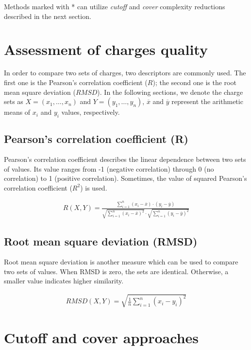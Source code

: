 \documentclass[oneside]{memoir}
\newcommand\ddfrac[2]{\frac{\displaystyle #1}{\displaystyle #2}}
\begin{document}
\bigskip

Methods marked with * can utilize \textit{cutoff} and \textit{cover} complexity reductions described in the next section.

\chapter*{Assessment of charges quality}

In order to compare two sets of charges, two descriptors are commonly used. The first one is the Pearson's correlation coefficient ($R$); the second one is the root mean square deviation ($RMSD$). In the following sections, we denote the charge sets as $X = (x_1, \ldots, x_n)$ and $Y = (y_1, \ldots, y_n)$, $\overline{x}$ and $\overline{y}$ represent the arithmetic means of $x_i$ and $y_i$ values, respectively.

\section*{Pearson's correlation coefficient (R)}

Pearson's correlation coefficient describes the linear dependence between two sets of values. Its value ranges from -1 (negative correlation) through 0 (no correlation) to 1 (positive correlation). Sometimes, the value of squared Pearson's correlation coefficient ($R^2$) is used.

\begin{align*}
R(X, Y) = \ddfrac{\sum_{i = 1}^n (x_i - \overline{x})\cdot(y_i - \overline{y})}{\sqrt{\sum_{i = 1}^n(x_i - \overline{x})^2}\cdot\sqrt{\sum_{i = 1}^n(y_i - \overline{y})^2}}
\end{align*}

\section*{Root mean square deviation (RMSD)}

Root mean square deviation is another measure which can be used to compare two sets of values. When RMSD is zero, the sets are identical. Otherwise, a smaller value indicates higher similarity.

\begin{align*}
RMSD(X, Y) =\sqrt{ \ddfrac{1}{n}\sum_{i = 1}^n (x_i - y_i)^2}
\end{align*}

\chapter*{Cutoff and cover approaches}
\end{document}
